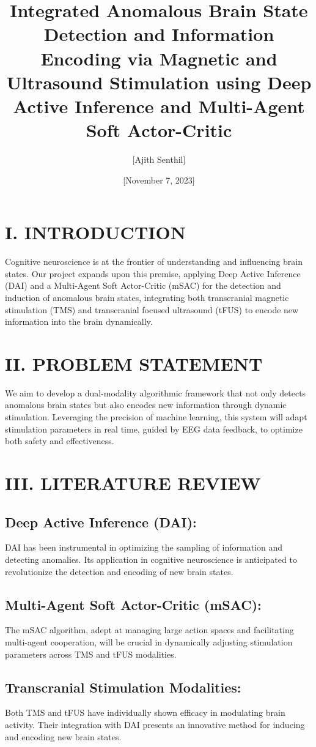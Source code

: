 \documentclass{article}
\title{Integrated Anomalous Brain State Detection and Information Encoding via Magnetic and Ultrasound Stimulation using Deep Active Inference and Multi-Agent Soft Actor-Critic}
\author{[Ajith Senthil]}
\date{[November 7, 2023]}
\begin{document}
\maketitle

\section*{I. INTRODUCTION}
Cognitive neuroscience is at the frontier of understanding and influencing brain states. Our project expands upon this premise, applying Deep Active Inference (DAI) and a Multi-Agent Soft Actor-Critic (mSAC) for the detection and induction of anomalous brain states, integrating both transcranial magnetic stimulation (TMS) and transcranial focused ultrasound (tFUS) to encode new information into the brain dynamically.

\section*{II. PROBLEM STATEMENT}
We aim to develop a dual-modality algorithmic framework that not only detects anomalous brain states but also encodes new information through dynamic stimulation. Leveraging the precision of machine learning, this system will adapt stimulation parameters in real time, guided by EEG data feedback, to optimize both safety and effectiveness.

\section*{III. LITERATURE REVIEW}
\subsection*{Deep Active Inference (DAI):}
DAI has been instrumental in optimizing the sampling of information and detecting anomalies. Its application in cognitive neuroscience is anticipated to revolutionize the detection and encoding of new brain states.

\subsection*{Multi-Agent Soft Actor-Critic (mSAC):}
The mSAC algorithm, adept at managing large action spaces and facilitating multi-agent cooperation, will be crucial in dynamically adjusting stimulation parameters across TMS and tFUS modalities.

\subsection*{Transcranial Stimulation Modalities:}
Both TMS and tFUS have individually shown efficacy in modulating brain activity. Their integration with DAI presents an innovative method for inducing and encoding new brain states.
\end{document}
